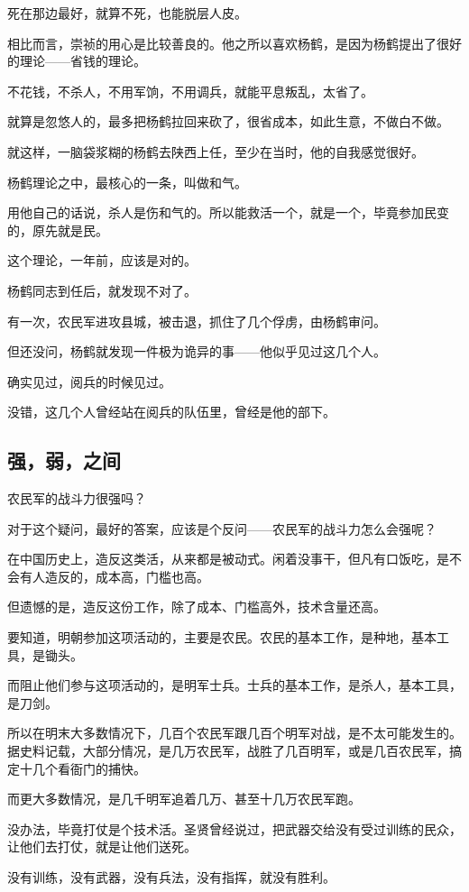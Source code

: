 \begin{multicols}{\theparacolNo}
死在那边最好，就算不死，也能脱层人皮。

相比而言，崇祯的用心是比较善良的。他之所以喜欢杨鹤，是因为杨鹤提出了很好的理论——省钱的理论。

不花钱，不杀人，不用军饷，不用调兵，就能平息叛乱，太省了。

就算是忽悠人的，最多把杨鹤拉回来砍了，很省成本，如此生意，不做白不做。

就这样，一脑袋浆糊的杨鹤去陕西上任，至少在当时，他的自我感觉很好。

杨鹤理论之中，最核心的一条，叫做和气。

用他自己的话说，杀人是伤和气的。所以能救活一个，就是一个，毕竟参加民变的，原先就是民。

这个理论，一年前，应该是对的。

杨鹤同志到任后，就发现不对了。

有一次，农民军进攻县城，被击退，抓住了几个俘虏，由杨鹤审问。

但还没问，杨鹤就发现一件极为诡异的事——他似乎见过这几个人。

确实见过，阅兵的时候见过。

没错，这几个人曾经站在阅兵的队伍里，曾经是他的部下。

\subsection{强，弱，之间}
农民军的战斗力很强吗？

对于这个疑问，最好的答案，应该是个反问——农民军的战斗力怎么会强呢？

在中国历史上，造反这类活，从来都是被动式。闲着没事干，但凡有口饭吃，是不会有人造反的，成本高，门槛也高。

但遗憾的是，造反这份工作，除了成本、门槛高外，技术含量还高。

要知道，明朝参加这项活动的，主要是农民。农民的基本工作，是种地，基本工具，是锄头。

而阻止他们参与这项活动的，是明军士兵。士兵的基本工作，是杀人，基本工具，是刀剑。

所以在明末大多数情况下，几百个农民军跟几百个明军对战，是不太可能发生的。据史料记载，大部分情况，是几万农民军，战胜了几百明军，或是几百农民军，搞定十几个看衙门的捕快。

而更大多数情况，是几千明军追着几万、甚至十几万农民军跑。

没办法，毕竟打仗是个技术活。圣贤曾经说过，把武器交给没有受过训练的民众，让他们去打仗，就是让他们送死。

没有训练，没有武器，没有兵法，没有指挥，就没有胜利。


\end{multicols}
